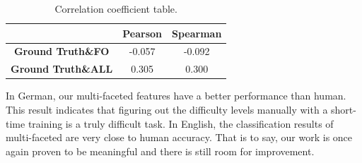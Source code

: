 \begin{table}[th]
	\centering
	\scriptsize
	\begin{tabular}{|c|c|c|}
		\hline
		& \textbf{Pearson} & \textbf{Spearman} \\ \hline
		\textbf{Ground Truth\&FO} & -0.057 & -0.092 \\ \hline
		\textbf{Ground Truth\&ALL} & 0.305 & 0.300 \\ \hline
	\end{tabular}
\caption{\label{tab:coefficients} Correlation coefficient table.}
\end{table}

In German, our multi-faceted features have a better performance than human.
This result indicates that figuring out the difficulty levels manually with a short-time training is a truly difficult task. 
In English, the classification results of multi-faceted are very close to human accuracy. 
That is to say, our work is once again proven to be meaningful and there is still room for improvement.

	
